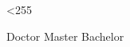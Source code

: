 
\makeatletter
{}
\loop \catcode{} \ifnum\@tempcnta<255 \advance \@tempcnta \@ne
\repeat
\makeatother

\newif\ifxueweidoctor %
\newif\ifxueweimaster
\newif\ifxueweibachelor
\def\temp{Doctor}
\ifx\temp\xuewei
  \xueweidoctortrue  \xueweimasterfalse  \xueweibachelorfalse
\fi
\def\temp{Master}
\ifx\temp\xuewei
  \xueweidoctorfalse  \xueweimastertrue  \xueweibachelorfalse
\fi
\def\temp{Bachelor}
\ifx\temp\xuewei
  \xueweidoctorfalse  \xueweimasterfalse  \xueweibachelortrue
\fi

\ifxueweidoctor
  \newcommand{\cxuewei}{博士}
  \newcommand{\exuewei}{Doctor}
  \newcommand{\exueweier}{Doctoral}
  \newcommand{\xueweishort}{博}
\fi

\ifxueweimaster
  \newcommand{\cxuewei}{硕士}
  \newcommand{\exuewei}{Master}
  \newcommand{\exueweier}{Master}
  \newcommand{\xueweishort}{硕}
\fi

\ifxueweibachelor
  \newcommand{\cxuewei}{本科}
  \newcommand{\exuewei}{Bachelor}
  \newcommand{\exueweier}{Bachelor}
  \newcommand{\xueweishort}{本}
\fi